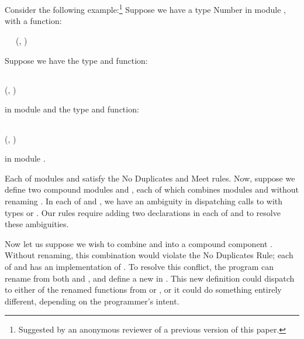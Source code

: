 Consider the following example:\footnote{Suggested by 
an anonymous reviewer of a previous version of this paper.}
Suppose we have a type Number in module , with a
function:
\begin{FortressCode}
{\tt ~~}\+ \COLONOP (, ) \rightarrow {}\-
\end{FortressCode}
Suppose we have the type and function:
\begin{FortressCode}
{\tt ~~}\+ \SHORTCUT{<}  \\
   \COLONOP (, ) \rightarrow {}\-
\end{FortressCode}
in module  and the type and function:
\begin{FortressCode}
{\tt ~~}\+ \SHORTCUT{<}  \\
   \COLONOP (, ) \rightarrow {}\-
\end{FortressCode}
in module .

Each of modules  and  satisfy the No Duplicates and Meet rules.
Now, suppose we define two compound modules  and , 
each of which combines modules  and  without renaming .
In each of  and , 
we have an ambiguity 
in dispatching calls to  with types  or .
Our rules require adding two declarations in each of  and 
to resolve these ambiguities.

Now let us suppose we wish to combine  and  into a compound component .
Without renaming, this combination would violate the No Duplicates Rule;
each of  and  has an implementation of . 
To resolve this conflict, 
the program can rename  from both  and , 
and define a new  in . 
This new definition could dispatch to either of the renamed functions from  or , 
or it could do something entirely different, 
depending on the programmer's intent.

